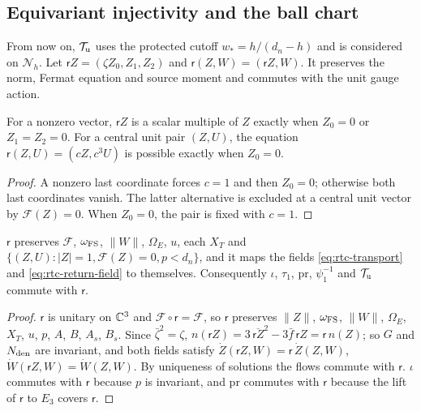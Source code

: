 \subsection{Equivariant injectivity and the ball chart}\label{sec:rtc-avoid}

From now on, $\mathcal T_{\rm u}$ uses the protected cutoff $w_*=h/(d_n-h)$ and is considered on $\mathcal N_h$.
Let $\mathsf r Z=(\zeta Z_0,Z_1,Z_2)$ and $\mathsf r(Z,W)=(\mathsf r Z,W)$.
It preserves the norm, Fermat equation and source moment and commutes with the unit gauge action.

\begin{lemma}\label{lem:rtc-fixed}
For a nonzero vector, $\mathsf r Z$ is a scalar multiple of $Z$ exactly when $Z_0=0$ or $Z_1=Z_2=0$.
For a central unit pair $(Z,U)$, the equation $\mathsf r(Z,U)=(cZ,c^3U)$ is possible exactly when $Z_0=0$.
\end{lemma}
\begin{proof}
A nonzero last coordinate forces $c=1$ and then $Z_0=0$; otherwise both last coordinates vanish.
The latter alternative is excluded at a central unit vector by $\mathcal F(Z)=0$.
When $Z_0=0$, the pair is fixed with $c=1$.
\end{proof}


\begin{lemma}[Equivariance]\label{lem:rtc-equivariant}
$\mathsf r$ preserves $\mathcal F$, $\omega_{\rm FS}$, $\|W\|$, $\Omega_E$, $u$, each $X_T$ and $\{(Z,U):|Z|=1,\mathcal F(Z)=0,p<d_n\}$, and it maps the fields
\eqref{eq:rtc-transport} and \eqref{eq:rtc-return-field} to themselves. Consequently $\iota$, $\tau_1$, $\mathrm{pr}$, $\psi_1^{-1}$ and
$\mathcal T_{\rm u}$ commute with $\mathsf r$.
\end{lemma}

\begin{proof}
$\mathsf r$ is unitary on $\mathbb{C}^3$ and $\mathcal F\circ\mathsf r=\mathcal F$, so $\mathsf r$ preserves $\|Z\|$, $\omega_{\rm FS}$, $\|W\|$, $\Omega_E$, $X_T$, $u$, $p$,
$A$, $B$, $A_s$, $B_s$. Since $\bar\zeta^2=\zeta$, $n(\mathsf r Z)=3\,\overline{\mathsf r Z}^2-3\bar f\,\mathsf r Z=\mathsf r\,n(Z)$; so $G$ and $N_{\rm den}$ are invariant,
and both fields satisfy $\dot Z(\mathsf r Z,W)=\mathsf r\,\dot Z(Z,W)$, $\dot W(\mathsf r Z,W)=\dot W(Z,W)$. By uniqueness of solutions the flows commute
with $\mathsf r$. $\iota$ commutes with $\mathsf r$ because $p$ is invariant, and $\mathrm{pr}$ commutes with $\mathsf r$ because the lift of $\mathsf r$ to
$E_3$ covers $\mathsf r$.
\end{proof}


